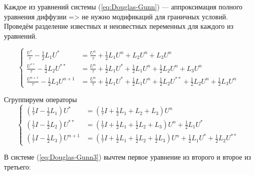 \documentclass[a4paper,12pt]{article}
\begin{document}
Каждое из уравнений системы (\ref{eq:Douglas-Gunn}) --- аппроксимация полного уравнения диффузии => не нужно модификаций для граничных условий.
Проведём разделение известных и неизвестных переменных для каждого из уравнений.

\begin{equation*}
  \begin{cases}
    \frac{U^{*}}{\tau}  - \frac{1}{2} L_1 U^{*} &= \frac{U^n}{\tau} + \frac{1}{2} L_1 U^n +  L_2 U^n +  L_3 U^n \\
    \frac{U^{**}}{\tau} - \frac{1}{2} L_2 U^{**} &= \frac{U^n}{\tau} + \frac{1}{2} L_1 U^{*}  + \frac{1}{2} L_1 U^n + \frac{1}{2} L_2 U^n + L_3 U^n \\
    \frac{U^{n+1}}{\tau} - \frac{1}{2} L_3 U^{n+1} &= \frac{U^n}{\tau} + \frac{1}{2} L_1 U^{*}   + \frac{1}{2} L_1 U^n + \frac{1}{2} L_2 U^{**}  + \frac{1}{2} L_2 U^n + \frac{1}{2} L_3 U^n
  \end{cases}
\end{equation*}

Сгруппируем операторы
\begin{equation}
  \label{eq:Douglas-Gunn3}
  \begin{cases}
    \left( \frac{1}{\tau} I - \frac{1}{2} L_1 \right) U^{*} &=
        \left( \frac{1}{\tau} I + \frac{1}{2} L_1 +  L_2 + L_3 \right) U^n \\
    \left( \frac{1}{\tau} I - \frac{1}{2} L_2 \right) U^{**} &=
        \left( \frac{1}{\tau} I + \frac{1}{2} L_1 + \frac{1}{2} L_2 + L_3 \right) U^n + \frac{1}{2} L_1 U^{*}\\
    \left( \frac{1}{\tau} I - \frac{1}{2} L_3 \right) U^{n+1} &=
        \left( \frac{1}{\tau} I  + \frac{1}{2} L_1 + \frac{1}{2} L_2 + \frac{1}{2} L_3 \right) U^n + \frac{1}{2} L_1 U^{*}   + \frac{1}{2} L_2 U^{**}
  \end{cases}
\end{equation}

В системе (\ref{eq:Douglas-Gunn3}) вычтем первое уравнение из второго и второе из третьего:
\end{document}
